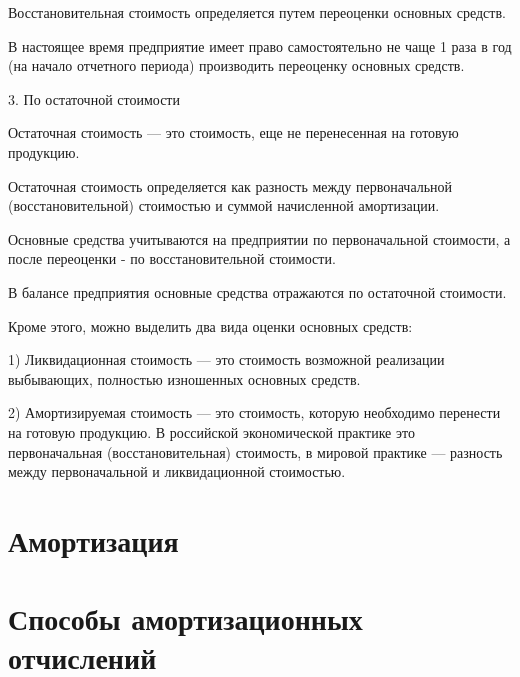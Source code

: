 Восстановительная стоимость определяется путем переоценки основных средств.

В настоящее время предприятие имеет право самостоятельно не чаще 1 раза в год
(на начало отчетного периода) производить переоценку основных средств.

3. По остаточной стоимости

Остаточная стоимость --- это стоимость, еще не перенесенная на готовую
продукцию.

Остаточная стоимость определяется как разность между первоначальной
(восстановительной) стоимостью и суммой начисленной амортизации.

Основные средства учитываются на предприятии по первоначальной стоимости, а
после переоценки - по восстановительной стоимости.

В балансе предприятия основные средства отражаются по остаточной стоимости.

Кроме этого, можно выделить два вида оценки основных средств:

1) Ликвидационная стоимость --- это стоимость возможной реализации выбывающих,
полностью изношенных основных средств.

2) Амортизируемая стоимость --- это стоимость, которую необходимо перенести на
готовую продукцию. В российской экономической практике это первоначальная
(восстановительная) стоимость, в мировой практике --- разность между
первоначальной и ликвидационной стоимостью.

\section{Амортизация}

\section{Способы амортизационных отчислений}
